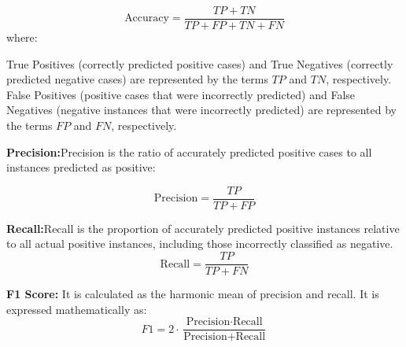 \[
\text{Accuracy} = \frac{TP + TN}{TP + FP + TN + FN}
\]
where:


True Positives (correctly predicted positive cases) and True Negatives (correctly predicted negative cases) are represented by the terms $TP$ and $TN$, respectively. False Positives (positive cases that were incorrectly predicted) and False Negatives (negative instances that were incorrectly predicted) are represented by the terms $FP$ and $FN$, respectively.



\textbf{Precision:}Precision is the ratio of accurately predicted positive cases to all instances predicted as positive:

\[
\text{Precision} = \frac{{TP}}{{TP} +{FP}}
\]

\textbf{Recall:}Recall is the proportion of accurately predicted positive instances relative to all actual positive instances, including those incorrectly classified as negative. 
\[
\text{Recall} = \frac{TP}{TP + FN}
\]

\textbf{F1 Score:} It is calculated as the 
  harmonic mean of precision and recall. It is expressed mathematically as:
\[
F1 = 2 \cdot \frac{\text{Precision} \cdot \text{Recall}}{\text{Precision} + \text{Recall}}
\]
